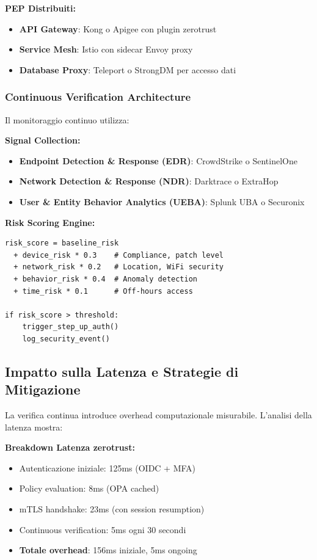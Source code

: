 \textbf{PEP Distribuiti:}
\begin{itemize}
    \item \textbf{API Gateway}: Kong o Apigee con plugin \gls{zerotrust}
    \item \textbf{Service Mesh}: Istio con sidecar Envoy proxy
    \item \textbf{Database Proxy}: Teleport o StrongDM per accesso dati
\end{itemize}

\subsubsection{\texorpdfstring{Continuous Verification Architecture}{3.5.3.2 - Continuous Verification Architecture}}

Il monitoraggio continuo utilizza:

\textbf{Signal Collection:}
\begin{itemize}
    \item \textbf{Endpoint Detection \& Response (EDR)}: CrowdStrike o SentinelOne
    \item \textbf{Network Detection \& Response (NDR)}: Darktrace o ExtraHop
    \item \textbf{User \& Entity Behavior Analytics (UEBA)}: Splunk UBA o Securonix
\end{itemize}

\textbf{Risk Scoring Engine:}
\begin{lstlisting}[caption={Calcolo Risk Score real-time},label={lst:risk_score}]
risk_score = baseline_risk
  + device_risk * 0.3    # Compliance, patch level
  + network_risk * 0.2   # Location, WiFi security  
  + behavior_risk * 0.4  # Anomaly detection
  + time_risk * 0.1      # Off-hours access

if risk_score > threshold:
    trigger_step_up_auth()
    log_security_event()
\end{lstlisting}

\subsection{\texorpdfstring{Impatto sulla Latenza e Strategie di Mitigazione}{3.5.4 - Impatto sulla Latenza e Strategie di Mitigazione}}

La verifica continua introduce overhead computazionale misurabile. L'analisi della latenza mostra:

\textbf{Breakdown Latenza \gls{zerotrust}:}
\begin{itemize}
    \item Autenticazione iniziale: 125ms (OIDC + MFA)
    \item Policy evaluation: 8ms (OPA cached)
    \item mTLS handshake: 23ms (con session resumption)
    \item Continuous verification: 5ms ogni 30 secondi
    \item \textbf{Totale overhead}: 156ms iniziale, 5ms ongoing
\end{itemize}

